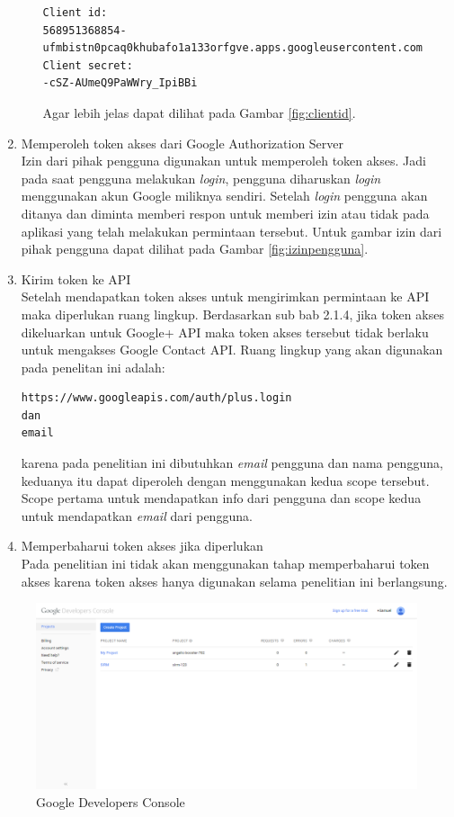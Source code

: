 \begin{enumerate}[(1)]
\begin{enumerate}
\begin{lstlisting}[basicstyle=\footnotesize]
Client id:
568951368854-ufmbistn0pcaq0khubafo1a133orfgve.apps.googleusercontent.com
Client secret:
-cSZ-AUmeQ9PaWWry_IpiBBi
\end{lstlisting}
Agar lebih jelas dapat dilihat pada Gambar \ref{fig:clientid}.
    \end{enumerate}
\item Memperoleh token akses dari Google Authorization Server\\
Izin dari pihak pengguna digunakan untuk memperoleh token akses. Jadi pada saat pengguna melakukan {\it login}, pengguna diharuskan {\it login} menggunakan akun Google miliknya sendiri. Setelah {\it login} pengguna akan ditanya dan diminta memberi respon untuk memberi izin atau tidak pada aplikasi yang telah melakukan permintaan tersebut. Untuk gambar izin dari pihak pengguna dapat dilihat pada Gambar \ref{fig:izinpengguna}.
\item Kirim token ke API\\
Setelah mendapatkan token akses untuk mengirimkan permintaan ke API maka diperlukan ruang lingkup. Berdasarkan sub bab 2.1.4, jika token akses dikeluarkan untuk Google+ API maka token akses tersebut tidak berlaku untuk mengakses Google Contact API. Ruang lingkup yang akan digunakan pada penelitan ini adalah:
\begin{lstlisting}[basicstyle=\footnotesize]
https://www.googleapis.com/auth/plus.login
dan
email
\end{lstlisting}
karena pada penelitian ini dibutuhkan {\it email} pengguna dan nama pengguna, keduanya itu dapat diperoleh dengan menggunakan kedua scope tersebut. Scope pertama untuk mendapatkan info dari pengguna dan scope kedua untuk mendapatkan {\it email} dari pengguna.
\item Memperbaharui token akses jika diperlukan\\
Pada penelitian ini tidak akan menggunakan tahap memperbaharui token akses
karena token akses hanya digunakan selama penelitian ini berlangsung.
\end{enumerate}

\begin{figure}[p]
\centering
\includegraphics[scale=0.4]{Gambar/GDC.png}
\caption[Google Developers Console]{Google Developers Console} 
\label{fig:gdc}
\end{figure}


